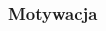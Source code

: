 \documentclass[aspectratio=169]{beamer}
\begin{document}
\begin{frame}%
	\frametitle{Motywacja}
	\begin{columns}
		\begin{column}{0.33\textwidth}
	   	 	\begin{figure}
	   		 \centering
	    		\end{figure}
		\end{column}
		\begin{column}{0.33\textwidth}
	   	 	\begin{figure}
	   		 \centering
	    		\end{figure}

\end{column}
\end{columns}
\end{frame}
\end{document}
